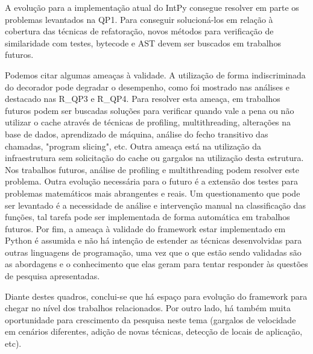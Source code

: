 \documentclass[sigconf]{acmart}
\begin{document}
A evolução para a implementação atual do IntPy consegue resolver em parte os problemas levantados na QP1. Para conseguir solucioná-los em relação à cobertura das técnicas de refatoração, novos métodos para verificação de similaridade com testes, bytecode e AST devem ser buscados em trabalhos futuros.

Podemos citar algumas ameaças à validade. A utilização de forma indiscriminada do decorador pode degradar o desempenho, como foi mostrado nas análises e destacado nas R\_QP3 e R\_QP4. Para resolver esta ameaça, em trabalhos futuros podem ser buscadas soluções para verificar quando vale a pena ou não utilizar o cache através de técnicas de profiling, multithreading, alterações na base de dados, aprendizado de máquina, análise do fecho transitivo das chamadas, "program slicing", etc. Outra ameaça está na utilização da infraestrutura sem solicitação do cache ou gargalos na utilização desta estrutura. Nos trabalhos futuros, análise de profiling e multithreading podem resolver este problema. Outra evolução necessária para o futuro é a extensão dos testes para problemas matemáticos mais abrangentes e reais. Um questionamento que pode ser levantado é a necessidade de análise e intervenção manual na classificação das funções, tal tarefa pode ser implementada de forma automática em trabalhos futuros. Por fim, a ameaça à validade do framework estar implementado em Python é assumida e não há intenção de estender as técnicas desenvolvidas para outras linguagens de programação, uma vez que o que estão sendo validadas são as abordagens e o conhecimento que elas geram para tentar responder às questões de pesquisa apresentadas.

Diante destes quadros, conclui-se que há espaço para evolução do framework para chegar no nível dos trabalhos relacionados. Por outro lado, há também muita oportunidade para crescimento da pesquisa neste tema (gargalos de velocidade em cenários diferentes, adição de novas técnicas, detecção de locais de aplicação, etc).



\end{document}
